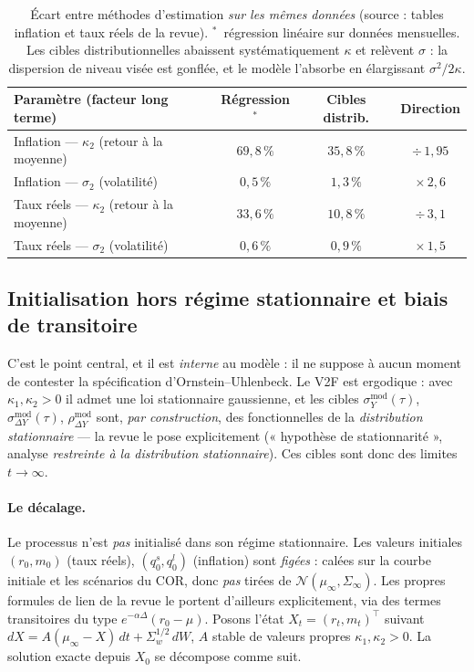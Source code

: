 \documentclass[11pt,a4paper]{article}
\theoremstyle{definition}
\newcommand{\Ncal}{\mathcal{N}}
\newcommand{\transp}{^{\!\top}}
\begin{document}
\begin{table}[h]
\centering\small
\renewcommand{\arraystretch}{1.25}
\begin{tabular}{@{}l c c c@{}}
\toprule
\textbf{Paramètre (facteur long terme)} & \textbf{Régression$^{\ast}$} & \textbf{Cibles distrib.} & \textbf{Direction} \\
\midrule
Inflation --- $\kappa_2$ (retour à la moyenne) & $69{,}8\,\%$ & $35{,}8\,\%$ & $\div\,1{,}95$ \\
Inflation --- $\sigma_2$ (volatilité) & $0{,}5\,\%$ & $1{,}3\,\%$ & $\times\,2{,}6$ \\
Taux réels --- $\kappa_2$ (retour à la moyenne) & $33{,}6\,\%$ & $10{,}8\,\%$ & $\div\,3{,}1$ \\
Taux réels --- $\sigma_2$ (volatilité) & $0{,}6\,\%$ & $0{,}9\,\%$ & $\times\,1{,}5$ \\
\bottomrule
\end{tabular}
\caption{Écart entre méthodes d'estimation \emph{sur les mêmes données} (source : tables inflation et taux réels de la revue). $^{\ast}$~régression linéaire sur données mensuelles. Les cibles distributionnelles abaissent systématiquement $\kappa$ et relèvent $\sigma$ : la dispersion de niveau visée est gonflée, et le modèle l'absorbe en élargissant $\sigma^2/2\kappa$.}
\label{tab:instab}
\end{table}

\subsection{Initialisation hors régime stationnaire et biais de transitoire}
\label{sec:transient}

C'est le point central, et il est \emph{interne} au modèle : il ne suppose à aucun moment de contester la spécification d'Ornstein--Uhlenbeck. Le V2F est ergodique : avec $\kappa_1,\kappa_2>0$ il admet une loi stationnaire gaussienne, et les cibles $\sigma^{\mathrm{mod}}_Y(\tau)$, $\sigma^{\mathrm{mod}}_{\Delta Y}(\tau)$, $\rho^{\mathrm{mod}}_{\Delta Y}$ sont, \emph{par construction}, des fonctionnelles de la \emph{distribution stationnaire} --- la revue le pose explicitement (« hypothèse de stationnarité », analyse \emph{restreinte à la distribution stationnaire}). Ces cibles sont donc des limites $t\to\infty$.

\paragraph{Le décalage.} Le processus n'est \emph{pas} initialisé dans son régime stationnaire. Les valeurs initiales $(r_0,m_0)$ (taux réels), $(q^s_0,q^l_0)$ (inflation) sont \emph{figées} : calées sur la courbe initiale et les scénarios du COR, donc \emph{pas} tirées de $\Ncal(\mu_\infty,\Sigma_\infty)$. Les propres formules de lien de la revue le portent d'ailleurs explicitement, via des termes transitoires du type $e^{-\alpha\Delta}(r_0-\mu)$. Posons l'état $X_t=(r_t,m_t)\transp$ suivant $dX=A(\mu_\infty-X)\,dt+\Sigma_w^{1/2}\,dW$, $A$ stable de valeurs propres $\kappa_1,\kappa_2>0$. La solution exacte depuis $X_0$ se décompose comme suit.
\end{document}
